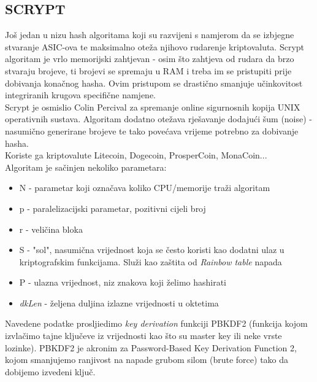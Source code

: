 \documentclass[12pt]{article}
\begin{document}
\pagebreak
\subsection{SCRYPT}
Još jedan u nizu hash algoritama koji su razvijeni s namjerom  da se izbjegne stvaranje ASIC-ova te maksimalno oteža njihovo rudarenje kriptovaluta. Scrypt algoritam je vrlo memorijski zahtjevan - osim što zahtjeva od rudara da brzo stvaraju brojeve, ti brojevi se spremaju u RAM i treba im se pristupiti prije dobivanja konačnog hasha. Ovim pristupom se drastično smanjuje učinkovitost integriranih krugova specifične namjene.\\
Scrypt je osmislio Colin Percival za spremanje online sigurnosnih kopija UNIX operativnih sustava. Algoritam dodatno otežava rješavanje dodajući šum (noise) - nasumično generirane brojeve te tako povećava vrijeme potrebno za dobivanje hasha. \\
Koriste ga kriptovalute Litecoin, Dogecoin, ProsperCoin, MonaCoin...\\
Algoritam je sačinjen nekoliko parametara:
\begin{itemize}
	\item N - parametar koji označava koliko CPU/memorije traži algoritam
	\item p - paralelizacijski parametar, pozitivni cijeli broj
	\item r - veličina bloka
	\item S - "sol", nasumična vrijednost koja se često koristi kao dodatni ulaz u kriptografskim funkcijama. Služi kao zaštita od \textit{Rainbow table} napada
	\item P - ulazna vrijednost, niz znakova koji želimo hashirati
	\item \textit{dkLen} - željena duljina izlazne vrijednosti u oktetima
\end{itemize}
%
Navedene podatke prosljiedimo \textit{key derivation} funkciji PBKDF2 (funkcija kojom izvlačimo tajne ključeve iz vrijednosti kao što su master key ili neke vrste lozinke). PBKDF2 je akronim za Password-Based Key Derivation Function 2, kojom smanjujemo ranjivost na napade grubom silom (brute force) tako da dobijemo izvedeni ključ.\cite{scrypt}

\pagebreak
\end{document}
